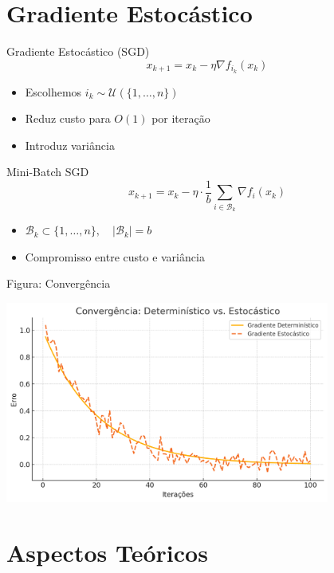 \documentclass{beamer}
\begin{document}
\section{Gradiente Estoc\'astico}

\begin{frame}{Gradiente Estoc\'astico (SGD)}
\[
    x_{k+1} = x_k - \eta \nabla f_{i_k}(x_k)
\]
\begin{itemize}
    \item Escolhemos \( i_k \sim \mathcal{U}(\{1, \ldots, n\}) \)
    \item Reduz custo para \( O(1) \) por itera\c{c}\~ao
    \item Introduz vari\^ancia
\end{itemize}
\end{frame}

\begin{frame}{Mini-Batch SGD}
\[
    x_{k+1} = x_k - \eta \cdot \frac{1}{b} \sum_{i \in \mathcal{B}_k} \nabla f_i(x_k)
\]
\begin{itemize}
    \item \( \mathcal{B}_k \subset \{1, \ldots, n\},\quad |\mathcal{B}_k| = b \)
    \item Compromisso entre custo e vari\^ancia
\end{itemize}
\end{frame}

\begin{frame}{Figura: Converg\^encia}
\begin{center}
    \includegraphics[width=0.8\textwidth]{convergencia_deterministico_estocastico.png}
\end{center}
\end{frame}

\section{Aspectos Te\'oricos}
\end{document}
